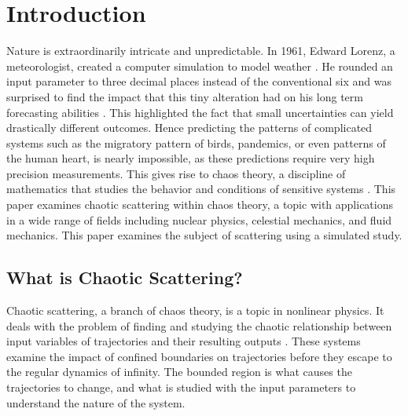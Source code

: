 \documentclass[12pt]{article} %
\begin{document}
\listoffigures
\tableofcontents %

\newpage


\section{Introduction} \label{Introduction}
Nature is extraordinarily intricate and unpredictable. In 1961, Edward Lorenz, a meteorologist, created a computer simulation to model weather \cite{WeatherSimulation}. He rounded an input parameter to three decimal places instead of the conventional six and was surprised to find the impact that this tiny alteration had on his long term forecasting abilities \cite{WeatherSimulation}. This highlighted the fact that small uncertainties can yield drastically different outcomes. Hence predicting the patterns of complicated systems such as the migratory pattern of birds, pandemics, or even patterns of the human heart, is nearly impossible, as these predictions require very high precision measurements. This gives rise to chaos theory, a discipline of mathematics that studies the behavior and conditions of sensitive systems \cite{chaoticIntro}. This paper examines chaotic scattering within chaos theory, a topic with applications in a wide range of fields including nuclear physics, celestial mechanics, and fluid mechanics. This paper examines the subject of scattering using a simulated study. 

\subsection{What is Chaotic Scattering?} \label{Intro:WhatIsChaoticScattering}

Chaotic scattering, a branch of chaos theory, is a topic in nonlinear physics. It deals with the problem of finding and studying the chaotic relationship between input variables of trajectories and their resulting outputs \cite{chaoticIntro}. These systems examine the impact of confined boundaries on trajectories before they escape to the regular dynamics of infinity. The bounded region is what causes the trajectories to change, and what is studied with the input parameters to understand the nature of the system. 
\end{document}
